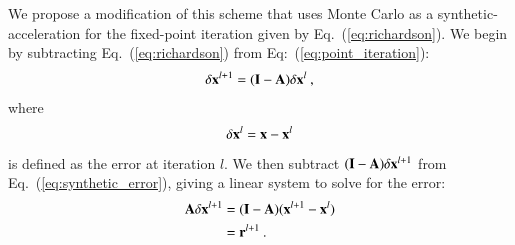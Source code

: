 \documentclass[preprint,12pt]{elsarticle}
\newcommand{\vA}{\ensuremath{\ve{A}}}
\newcommand{\vx}{\ensuremath{\ve{x}}}
\newcommand{\vr}{\ensuremath{\ve{r}}}
\newcommand{\vI}{\ensuremath{\ve{I}}}
\begin{document}
We propose a modification of this scheme that uses Monte Carlo as a
synthetic-acceleration for the fixed-point iteration given by
Eq.~(\ref{eq:richardson}). We begin by subtracting
Eq.~(\ref{eq:richardson}) from Eq:~(\ref{eq:point_iteration}):
\begin{equation}
  \delta \vx^{l+1} = (\vI - \vA)\delta \vx^{l}\:,
  \label{eq:synthetic_error}
\end{equation}
where
\begin{equation}
  \delta \vx^{l} = \vx - \vx^{l}
\end{equation}
is defined as the error at iteration $l$. We then subtract $(\vI-\vA)
\delta \vx^{l+1}$ from Eq.~(\ref{eq:synthetic_error}), giving a linear
system to solve for the error:
\begin{equation}
  \begin{split}
    \vA \delta \vx^{l+1} &= (\vI - \vA)(\vx^{l+1} - \vx^{l}) \\ &=
    \vr^{l+1}\:.
  \end{split}
  \label{eq:synthetic_error2}
\end{equation}
\end{document}
